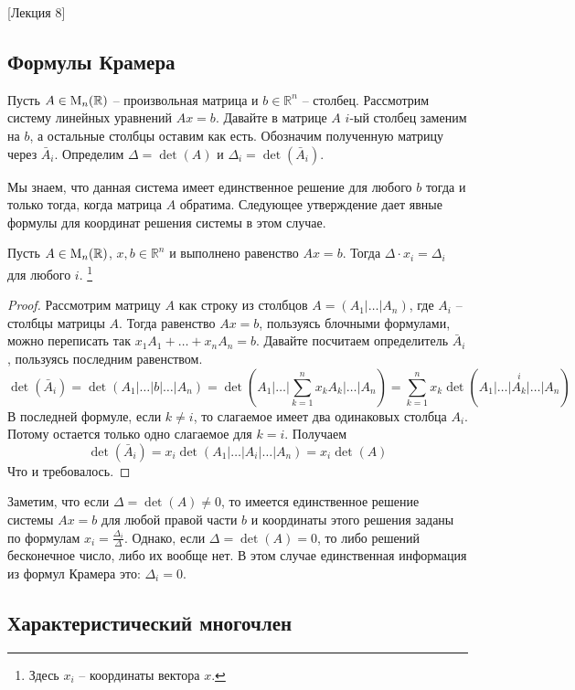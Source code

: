 [Лекция 8]


\subsection{Формулы Крамера}

Пусть $A\in\operatorname{M}_{n}(\mathbb R)$ -- произвольная матрица и $b\in\mathbb R^n$ -- столбец.
Рассмотрим систему линейных уравнений $Ax = b$.
Давайте в матрице $A$ $i$-ый столбец заменим на $b$, а остальные столбцы оставим как есть.
Обозначим полученную матрицу через $\bar A_i$.
Определим $\Delta = \det (A)$ и $\Delta_i = \det (\bar A_i)$.

Мы знаем, что данная система имеет единственное решение для любого $b$ тогда и только тогда, когда матрица $A$ обратима.
Следующее утверждение дает явные формулы для координат решения системы в этом случае.

\begin{claim}
Пусть $A\in\operatorname{M}_{n}(\mathbb R)$, $x,b\in \mathbb R^n$ и выполнено равенство $Ax = b$.
Тогда $\Delta \cdot x_i = \Delta_i$ для любого $i$.%
\footnote{Здесь $x_i$ -- координаты вектора $x$.}
\end{claim}
\begin{proof}
Рассмотрим матрицу $A$ как строку из столбцов $A = (A_1|\ldots|A_n)$, где $A_i$ -- столбцы матрицы $A$.
Тогда равенство $Ax = b$, пользуясь блочными формулами, можно переписать так $x_1 A_1 + \ldots + x_n A_n = b$.
Давайте посчитаем определитель $\bar A_i$, пользуясь последним равенством.
\[
\det (\bar A_i) = \det(A_1|\ldots|b|\ldots|A_n) = \det(A_1|\ldots|\sum_{k=1}^n x_k A_k|\ldots|A_n) = \sum_{k=1}^n x_k \det (
\stackrel{i}{A_1|\ldots|A_k|\ldots|A_n})
\]
В последней формуле, если $k\neq i$, то слагаемое имеет два одинаковых столбца $A_i$.
Потому остается только одно слагаемое для $k = i$.
Получаем
\[
\det(\bar A_i) = x_i \det(A_1|\ldots|A_i|\ldots|A_n) = x_i \det(A)
\]
Что и требовалось.
\end{proof}

Заметим, что если $\Delta = \det (A) \neq 0$, то имеется единственное решение системы $Ax = b$ для любой правой части $b$ и координаты этого решения заданы по формулам $x_i =\frac{\Delta_i}{\Delta}$.
Однако, если $\Delta = \det(A) = 0$, то либо решений бесконечное число, либо их вообще нет.
В этом случае единственная информация из формул Крамера это: $\Delta_i = 0$.


\subsection{Характеристический многочлен}

